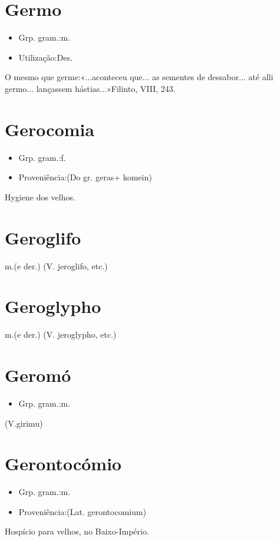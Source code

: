\section{Germo}
\begin{itemize}
\item {Grp. gram.:m.}
\end{itemize}
\begin{itemize}
\item {Utilização:Des.}
\end{itemize}
O mesmo que germe:«\textunderscore ...aconteceu que... as sementes de dessabor... até alli germo... lançassem hástias...\textunderscore »Filinto, VIII, 243.
\section{Gerocomia}
\begin{itemize}
\item {Grp. gram.:f.}
\end{itemize}
\begin{itemize}
\item {Proveniência:(Do gr. \textunderscore geras\textunderscore  + \textunderscore komein\textunderscore )}
\end{itemize}
Hygiene dos velhos.
\section{Geroglifo}
\textunderscore m.\textunderscore  (e der.)
(V. \textunderscore jeroglifo\textunderscore , etc.)
\section{Geroglypho}
\textunderscore m.\textunderscore  (e der.)
(V. \textunderscore jeroglypho\textunderscore , etc.)
\section{Geromó}
\begin{itemize}
\item {Grp. gram.:m.}
\end{itemize}
(V.girimu)
\section{Gerontocómio}
\begin{itemize}
\item {Grp. gram.:m.}
\end{itemize}
\begin{itemize}
\item {Proveniência:(Lat. \textunderscore gerontocomium\textunderscore )}
\end{itemize}
Hospício para velhos, no Baixo-Império.
